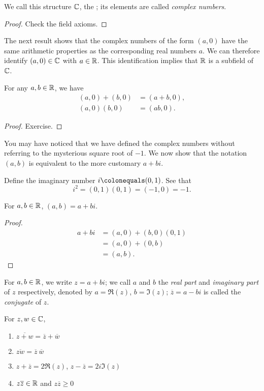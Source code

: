 We call this structure $\mathbb C$, the ; its elements are called \emph{complex numbers}.

\begin{proof}
Check the field axioms.
\end{proof}

The next result shows that the complex numbers of the form $(a,0)$ have the same arithmetic properties as the corresponding real numbers $a$. We can therefore identify $(a,0)\in\mathbb C$ with $a\in\mathbb R$. This identification implies that $\mathbb R$ is a subfield of $\mathbb C$.

\begin{lemma}
For any $a,b\in\mathbb R$, we have
\begin{align*}
(a,0)+(b,0)&=(a+b,0),\\
(a,0)(b,0)&=(ab,0).
\end{align*}
\end{lemma}

\begin{proof}
Exercise.
\end{proof}

You may have noticed that we have defined the complex numbers without referring to the mysterious square root of $-1$. We now show that the notation $(a,b)$ is equivalent to the more customary $a+bi$.

Define the imaginary number $i\colonequals(0,1)$. See that 
\[i^2=(0,1)(0,1)=(-1,0)=-1.\]

\begin{lemma}
For $a,b\in\mathbb R$, $(a,b)=a+bi$.
\end{lemma}

\begin{proof}
\begin{align*}
a+bi&=(a,0)+(b,0)(0,1)\\
&=(a,0)+(0,b)\\
&=(a,b).
\end{align*}
\end{proof}

For $a,b\in\mathbb R$, we write $z=a+bi$; we call $a$ and $b$ the \emph{real part} and \emph{imaginary part} of $z$ respectively, denoted by $a=\Re(z)$, $b=\Im(z)$; $\overline{z}=a-bi$ is called the \emph{conjugate} of $z$.

\begin{lemma}
For $z,w\in\mathbb C$,
\begin{enumerate}[label=(\roman*)]
\item $\overline{z+w}=\overline{z}+\overline{w}$
\item $\overline{zw}=\overline{z}\:\overline{w}$
\item $z+\overline{z}=2\Re(z)$, $z-\overline{z}=2i\Im(z)$
\item $z\overline{z}\in\mathbb R$ and $z\overline{z}\ge0$
\end{enumerate}
\end{lemma}

